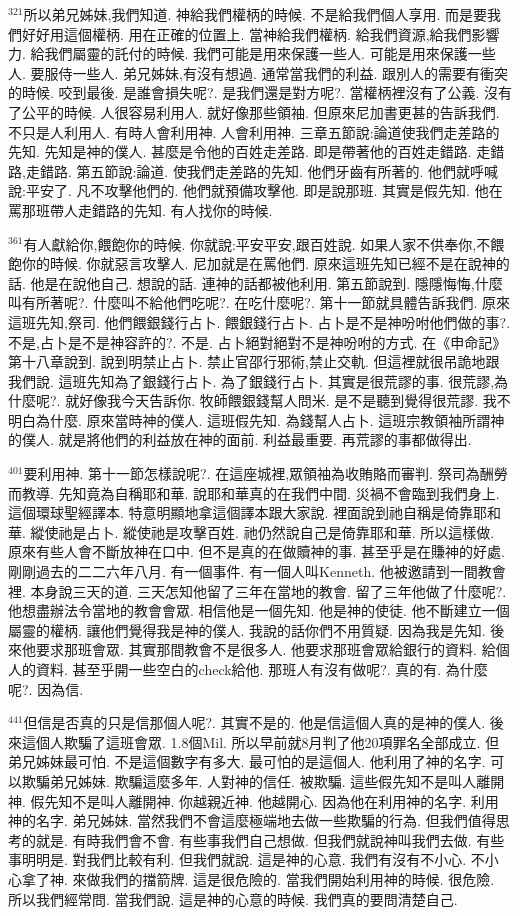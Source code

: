 \documentclass{book}
\begin{document}
$^{321}$所以弟兄姊妹,我們知道.
神給我們權柄的時候.
不是給我們個人享用.
而是要我們好好用這個權柄.
用在正確的位置上.
當神給我們權柄.
給我們資源,給我們影響力.
給我們屬靈的託付的時候.
我們可能是用來保護一些人.
可能是用來保護一些人.
要服侍一些人.
弟兄姊妹,有沒有想過.
通常當我們的利益.
跟別人的需要有衝突的時候.
咬到最後.
是誰會損失呢?.
是我們還是對方呢?.
當權柄裡沒有了公義.
沒有了公平的時候.
人很容易利用人.
就好像那些領袖.
但原來尼加書更甚的告訴我們.
不只是人利用人.
有時人會利用神.
人會利用神.
三章五節說:論道使我們走差路的先知.
先知是神的僕人.
甚麼是令他的百姓走差路.
即是帶著他的百姓走錯路.
走錯路,走錯路.
第五節說:論道.
使我們走差路的先知.
他們牙齒有所著的.
他們就呼喊說:平安了.
凡不攻擊他們的.
他們就預備攻擊他.
即是說那班.
其實是假先知.
他在罵那班帶人走錯路的先知.
有人找你的時候.

$^{361}$有人獻給你,餵飽你的時候.
你就說:平安平安,跟百姓說.
如果人家不供奉你,不餵飽你的時候.
你就惡言攻擊人.
尼加就是在罵他們.
原來這班先知已經不是在說神的話.
他是在說他自己.
想說的話.
連神的話都被他利用.
第五節說到.
隱隱悔悔,什麼叫有所著呢?.
什麼叫不給他們吃呢?.
在吃什麼呢?.
第十一節就具體告訴我們.
原來這班先知,祭司.
他們餵銀錢行占卜.
餵銀錢行占卜.
占卜是不是神吩咐他們做的事?.
不是,占卜是不是神容許的?.
不是.
占卜絕對絕對不是神吩咐的方式.
在《申命記》第十八章說到.
說到明禁止占卜.
禁止官邵行邪術,禁止交軌.
但這裡就很吊詭地跟我們說.
這班先知為了銀錢行占卜.
為了銀錢行占卜.
其實是很荒謬的事.
很荒謬,為什麼呢?.
就好像我今天告訴你.
牧師餵銀錢幫人問米.
是不是聽到覺得很荒謬.
我不明白為什麼.
原來當時神的僕人.
這班假先知.
為錢幫人占卜.
這班宗教領袖所謂神的僕人.
就是將他們的利益放在神的面前.
利益最重要.
再荒謬的事都做得出.

$^{401}$要利用神.
第十一節怎樣說呢?.
在這座城裡,眾領袖為收賄賂而審判.
祭司為酬勞而教導.
先知竟為自稱耶和華.
說耶和華真的在我們中間.
災禍不會臨到我們身上.
這個環球聖經譯本.
特意明顯地拿這個譯本跟大家說.
裡面說到祂自稱是倚靠耶和華.
縱使祂是占卜.
縱使祂是攻擊百姓.
祂仍然說自己是倚靠耶和華.
所以這樣做.
原來有些人會不斷放神在口中.
但不是真的在做贖神的事.
甚至乎是在賺神的好處.
剛剛過去的二二六年八月.
有一個事件.
有一個人叫Kenneth.
他被邀請到一間教會裡.
本身說三天的道.
三天怎知他留了三年在當地的教會.
留了三年他做了什麼呢?.
他想盡辦法令當地的教會會眾.
相信他是一個先知.
他是神的使徒.
他不斷建立一個屬靈的權柄.
讓他們覺得我是神的僕人.
我說的話你們不用質疑.
因為我是先知.
後來他要求那班會眾.
其實那間教會不是很多人.
他要求那班會眾給銀行的資料.
給個人的資料.
甚至乎開一些空白的check給他.
那班人有沒有做呢?.
真的有.
為什麼呢?.
因為信.

$^{441}$但信是否真的只是信那個人呢?.
其實不是的.
他是信這個人真的是神的僕人.
後來這個人欺騙了這班會眾.
1.8個Mil.
所以早前就8月判了他20項罪名全部成立.
但弟兄姊妹最可怕.
不是這個數字有多大.
最可怕的是這個人.
他利用了神的名字.
可以欺騙弟兄姊妹.
欺騙這麼多年.
人對神的信任.
被欺騙.
這些假先知不是叫人離開神.
假先知不是叫人離開神.
你越親近神.
他越開心.
因為他在利用神的名字.
利用神的名字.
弟兄姊妹.
當然我們不會這麼極端地去做一些欺騙的行為.
但我們值得思考的就是.
有時我們會不會.
有些事我們自己想做.
但我們就說神叫我們去做.
有些事明明是.
對我們比較有利.
但我們就說.
這是神的心意.
我們有沒有不小心.
不小心拿了神.
來做我們的擋箭牌.
這是很危險的.
當我們開始利用神的時候.
很危險.
所以我們經常問.
當我們說.
這是神的心意的時候.
我們真的要問清楚自己.
\end{document}
